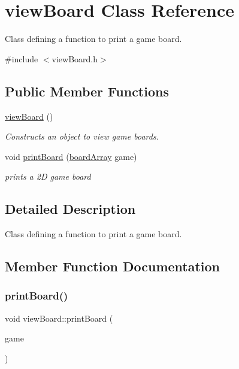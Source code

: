 \hypertarget{classview_board}{}\section{view\+Board Class Reference}
\label{classview_board}


Class defining a function to print a game board.  




{\ttfamily \#include $<$view\+Board.\+h$>$}

\subsection*{Public Member Functions}
\begin{DoxyCompactItemize}
\item 
\mbox{\label{classview_board_a06134830a0df2c19f2d2d8ef7082bd38}} 
\hyperlink{classview_board_a06134830a0df2c19f2d2d8ef7082bd38}{view\+Board} ()
\begin{DoxyCompactList}\small\item\em Constructs an object to view game boards. \end{DoxyCompactList}\item 
void \hyperlink{classview_board_a8265aeb103350ac413dd87eec331d724}{print\+Board} (\hyperlink{_g_o_l___board_8h_aa8eecda883d639cd0032a7263411964f}{board\+Array} game)
\begin{DoxyCompactList}\small\item\em prints a 2D game board \end{DoxyCompactList}\end{DoxyCompactItemize}


\subsection{Detailed Description}
Class defining a function to print a game board. 

\subsection{Member Function Documentation}
\mbox{\label{classview_board_a8265aeb103350ac413dd87eec331d724}} 
\subsubsection{\texorpdfstring{print\+Board()}{printBoard()}}
{\footnotesize\ttfamily void view\+Board\+::print\+Board (\begin{DoxyParamCaption}\item[{\hyperlink{_g_o_l___board_8h_aa8eecda883d639cd0032a7263411964f}{board\+Array}}]{game }\end{DoxyParamCaption})}



